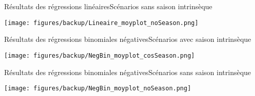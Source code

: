 \begin{frame}{Résultats des régressions linéaires}{Scénarios sans saison intrinsèque}
\vspace{-.4cm}
	\begin{center}
	\texttt{[image: figures/backup/Lineaire\_moyplot\_noSeason.png]}
	\end{center}
\end{frame}


\begin{frame}{Résultats des régressions binomiales négatives}{Scénarios avec saison intrinsèque}
\vspace{-.4cm}
	\begin{center}
	\texttt{[image: figures/backup/NegBin\_moyplot\_cosSeason.png]}
	\end{center}
\end{frame}


\begin{frame}{Résultats des régressions binomiales négatives}{Scénarios sans saison intrinsèque}
\vspace{-.4cm}
	\begin{center}
	\texttt{[image: figures/backup/NegBin\_moyplot\_noSeason.png]}
	\end{center}
\end{frame}



